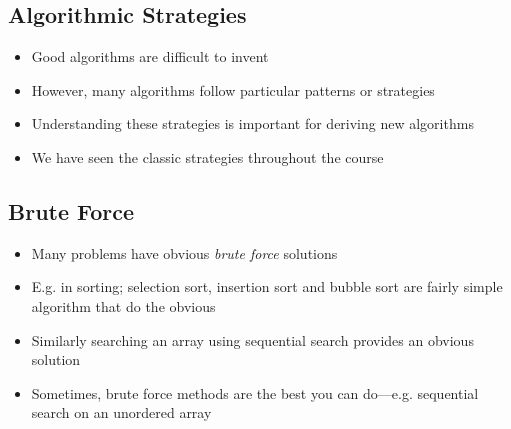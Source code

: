 \Outline %

\begin{slide}
\section{Algorithmic Strategies}

\begin{PauseHighLight}
  \begin{itemize}
  \item Good algorithms are difficult to invent\pause
  \item However, many algorithms follow particular patterns or
    strategies\pause
  \item Understanding these strategies is important for deriving new
    algorithms\pause
  \item We have seen the classic strategies throughout the course\pause
  \end{itemize}
\end{PauseHighLight}

\end{slide}


\begin{slide}
\section{Brute Force}

\begin{PauseHighLight}
  \begin{itemize}
  \item Many problems have obvious \emph{brute force} solutions\pause
  \item E.g. in sorting; selection sort, insertion sort and bubble sort
    are fairly simple algorithm that do the obvious\pause
  \item Similarly searching an array using sequential search provides an
    obvious solution\pause
  \item Sometimes, brute force methods are the best you can
    do\pause---e.g. sequential search on an unordered array\pause
  \end{itemize}
\end{PauseHighLight}

\end{slide}

